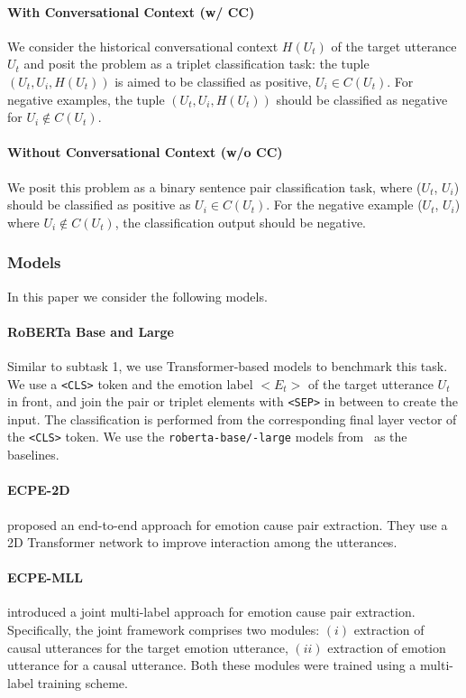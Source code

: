 \documentclass[smallextended]{svjour3}
\newcommand\code[1]{\texttt{#1}}
\newcommand\0{\hphantom{0}}
\begin{document}
\paragraph{With Conversational Context (w/ CC)}
We consider the historical conversational context $H(U_t)$ of the target utterance $U_t$ and posit the problem as a triplet classification task: 
the tuple $(U_t, U_i, H(U_t))$ is aimed to be classified as positive, $U_i \in C(U_t)$. For negative examples, the tuple $(U_t, U_i, H(U_t))$ should be classified as negative for $U_i \notin C(U_t)$.

\paragraph{Without Conversational Context (w/o CC)}
We posit this problem as a binary sentence pair classification task, where ($U_t$, $U_i$) should be classified as positive as $U_i \in C(U_t)$. For the negative example ($U_t$, $U_i$) where $U_i \notin C(U_t)$, the classification output should be negative.



\subsubsection{Models}
In this paper we consider the following models.
\paragraph{RoBERTa Base and Large}
Similar to subtask 1, we use Transformer-based models to benchmark this task. We use a \code{<CLS>} token and the emotion label ${<}E_t{>}$ of the target utterance $U_t$ in front, and join the pair or triplet elements with \code{<SEP>} in between to create the input. 
The classification is performed from the corresponding final layer vector of the \code{<CLS>} token. 
We use the \code{roberta-base/-large} models from~\citep{liu2019roberta} as the baselines.


\paragraph{ECPE-2D}
\citet{DBLP:conf/acl/DingXY20} proposed an end-to-end approach for emotion cause pair extraction. They use a 2D Transformer network to improve interaction among the utterances.

\paragraph{ECPE-MLL}
\citet{DBLP:conf/emnlp/DingXY20} introduced a joint multi-label approach for emotion cause pair extraction. Specifically, the joint framework comprises two modules: $(i)$ extraction of causal utterances for the target emotion utterance, $(ii)$ extraction of emotion utterance for a causal utterance. Both these modules were trained using a multi-label training scheme. 
\end{document}
